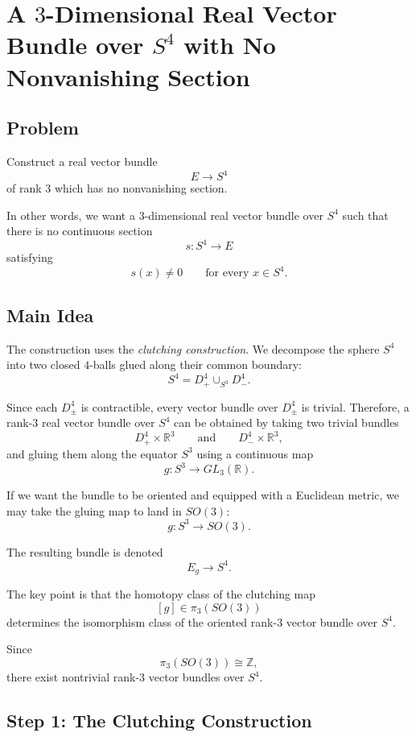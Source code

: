 \documentclass[12pt,a4paper]{article}
\theoremstyle{notespace}
\begin{document}
\section{A \(3\)-Dimensional Real Vector Bundle over \(S^4\) with No Nonvanishing Section}

\subsection{Problem}

Construct a real vector bundle
\[
E \longrightarrow S^4
\]
of rank \(3\) which has no nonvanishing section.

In other words, we want a \(3\)-dimensional real vector bundle over \(S^4\) such that there is no continuous section
\[
s:S^4\longrightarrow E
\]
satisfying
\[
s(x)\neq 0
\qquad
\text{for every }x\in S^4.
\]

\subsection{Main Idea}

The construction uses the \emph{clutching construction}. We decompose the sphere \(S^4\) into two closed \(4\)-balls glued along their common boundary:
\[
S^4 = D^4_+ \cup_{S^3} D^4_- .
\]

Since each \(D^4_\pm\) is contractible, every vector bundle over \(D^4_\pm\) is trivial. Therefore, a rank-\(3\) real vector bundle over \(S^4\) can be obtained by taking two trivial bundles
\[
D^4_+ \times \mathbb R^3
\qquad
\text{and}
\qquad
D^4_- \times \mathbb R^3,
\]
and gluing them along the equator \(S^3\) using a continuous map
\[
g:S^3\longrightarrow GL_3(\mathbb R).
\]

If we want the bundle to be oriented and equipped with a Euclidean metric, we may take the gluing map to land in \(SO(3)\):
\[
g:S^3\longrightarrow SO(3).
\]

The resulting bundle is denoted
\[
E_g \longrightarrow S^4.
\]

The key point is that the homotopy class of the clutching map
\[
[g]\in \pi_3(SO(3))
\]
determines the isomorphism class of the oriented rank-\(3\) vector bundle over \(S^4\).

Since
\[
\pi_3(SO(3))\cong \mathbb Z,
\]
there exist nontrivial rank-\(3\) vector bundles over \(S^4\).

\subsection{Step 1: The Clutching Construction}
\end{document}
